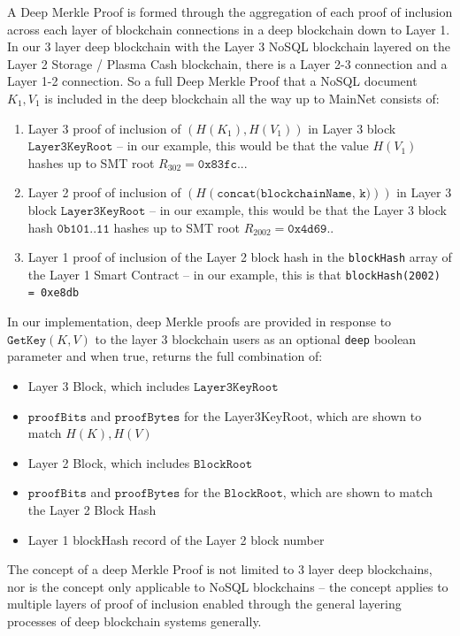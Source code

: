 \documentclass{article}
\newcommand{\hash}[1]{H(#1)}
\newcommand{\proofBits}{\texttt{proofBits}}
\newcommand{\proofBytes}{\texttt{proofBytes}}
\begin{document}
A Deep Merkle Proof is formed through the aggregation of each proof of inclusion across each layer of blockchain connections in a deep blockchain down to Layer 1.  In our 3 layer deep blockchain with the Layer 3 NoSQL blockchain layered on the Layer 2 Storage / Plasma Cash blockchain, there is a Layer 2-3 connection and a Layer 1-2 connection.  So a full Deep Merkle Proof that a NoSQL document $K_1, V_1$ is included in the deep blockchain all the way up to MainNet consists of: 
\begin{enumerate}
\item Layer 3 proof of inclusion of $(H(K_1), H(V_1))$ in Layer 3 block $\texttt{Layer3KeyRoot}$ -- in our example, this would be that the value $\hash{V_1}$ hashes up to SMT root $R_{302}=\texttt{0x83fc..}$.

\item Layer 2 proof of inclusion of $(\hash{\texttt{concat(blockchainName, k)}})$ in Layer 3 block $\texttt{Layer3KeyRoot}$ -- in our example, this would be that the Layer 3 block hash  $\texttt{0b101..11}$ hashes up to SMT root  
 $R_{2002}=\texttt{0x4d69..}$    
 
\item Layer 1 proof of inclusion of the Layer 2 block hash in the \texttt{blockHash} array of the Layer 1 Smart Contract -- in our example, this is that \texttt{blockHash(2002) = 0xe8db}  
\end{enumerate}
In our implementation, deep Merkle proofs are provided in response to $\texttt{GetKey}(K,V)$ to the layer 3 blockchain users as an optional \texttt{deep} boolean parameter and when true,  returns the full combination of:
\begin{itemize}
    \item Layer 3 Block, which includes $\texttt{Layer3KeyRoot}$
    \item $\proofBits$ and $\proofBytes$ for the Layer3KeyRoot, which are shown to match $H(K), H(V)$
    \item Layer 2 Block, which includes $\texttt{BlockRoot}$
    \item $\proofBits$ and $\proofBytes$ for the $\texttt{BlockRoot}$, which are shown to match the Layer 2 Block Hash
    \item Layer 1 blockHash record of the Layer 2 block number    
\end{itemize}

The concept of a deep Merkle Proof is not limited to 3 layer deep blockchains, nor is the concept only applicable to NoSQL blockchains -- the concept applies to multiple layers of proof of inclusion enabled through the general layering processes of deep blockchain systems generally.
\end{document}
